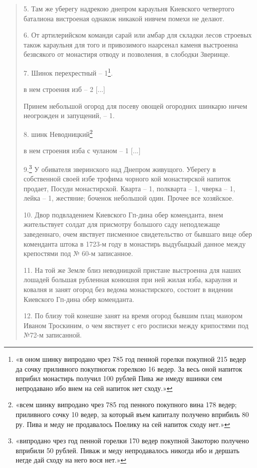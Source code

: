 \begin{quotation}
5. Там же уберегу надрекою днепром караульня Киевского четвертого баталиона вистроеная однакож никакой нивчем помехи не делают.

6. От артилерийском команди сарай или амбар для складки лесов строевых також караульня для того и привозимого наарсенал каменя выстроенна безвсякого от монастиря отводу и позволения, в слободки Зверинце.

7. Шинок перехрестный – 1\footnote{«в оном шинку випродано чрез 785 год пенной горелки покупной 215 ведер да сочку приливного покупногож горелкою 16 ведер. За весь оной напиток вприбил монастирь получил 100 рублей Пива же имеду вшинки сем непродавано ибо внем на сей напиток нет сходу.»}.

в нем строения изб – 2 [...]

Принем небольшой огород для посеву овощей огородних шинкарю ничем неогрожден и запущений, – 1.

8. шинк Неводницкий\footnote{«всем шинку випродано чрез 785 год пенного покупного вина 178 ведер; приливного сочку 10 ведер, за который въем капиталу получено вприбиль 80 ру. Пива и меду не продавалось Поелику на сей напиток сходу нет.»}

в нем строения изба с чуланом – 1 [...]

9.\footnote{«випродано чрез год пенной горелки 170 ведер покупной Закоторю получено вприбили 50 рублей. Пиваж и меду непродавалось никогда ибо и дершать негде дай сходу на него вося нет.»} У обивателя зверинского над Днепром живущого. Уберегу в собственной своей избе трофима чорного кой монастирской напиток продает, Посуди монастирской. Кварта – 1, полкварта – 1, чверка – 1, лейка – 1, жестяние; боченок небольшой один. Прочее все хозяйское.

10. Двор подвладением Киевского Гп-дина обер коменданта, внем жительствует солдат для присмотру большого саду неподлежаще заведеннаго, очем явствует писменное свидетельство от бывшаго вице обер коменданта штока в 1723-м году в монастирь выдубыцкый данное между крепостями под № 60-м записанное.

11. На той же Земле близ неводницкой пристане выстроенна для наших лошадей большая рубленная конюшня при ней жилая изба, караулня и ковалня и занят огород без ведома монастирского, состоит в видении Киевского Гп-дина обер коменданта.

12. По близу той конешне занят на время огород бывшим плац маиором Иваном Троскиним, о чем явствует с его росписки между крипостями под №72-м записанной.
\end{quotation}

